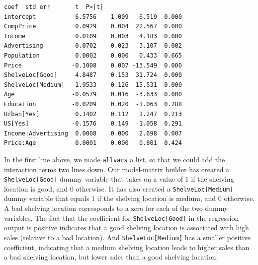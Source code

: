 \documentclass[11pt]{article}
\makeatletter
\newcommand{\boxspacing}{\kern\kvtcb@left@rule\kern\kvtcb@boxsep}
\newcommand{\prompt}[4]{
        {\ttfamily\llap{{\color{#2}[#3]:\hspace{3pt}#4}}\vspace{-\baselineskip}}
    }
\makeatother
\begin{document}
            \begin{tcolorbox}[breakable, size=fbox, boxrule=.5pt, pad at break*=1mm, opacityfill=0]
\prompt{Out}{outcolor}{36}{\boxspacing}
\begin{Verbatim}[commandchars=\\\{\}]
                      coef  std err       t  P>|t|
intercept           6.5756    1.009   6.519  0.000
CompPrice           0.0929    0.004  22.567  0.000
Income              0.0109    0.003   4.183  0.000
Advertising         0.0702    0.023   3.107  0.002
Population          0.0002    0.000   0.433  0.665
Price              -0.1008    0.007 -13.549  0.000
ShelveLoc[Good]     4.8487    0.153  31.724  0.000
ShelveLoc[Medium]   1.9533    0.126  15.531  0.000
Age                -0.0579    0.016  -3.633  0.000
Education          -0.0209    0.020  -1.063  0.288
Urban[Yes]          0.1402    0.112   1.247  0.213
US[Yes]            -0.1576    0.149  -1.058  0.291
Income:Advertising  0.0008    0.000   2.698  0.007
Price:Age           0.0001    0.000   0.801  0.424
\end{Verbatim}
\end{tcolorbox}
        
    In the first line above, we made \texttt{allvars} a list, so that we
could add the interaction terms two lines down. Our model-matrix builder
has created a \texttt{ShelveLoc{[}Good{]}} dummy variable that takes on
a value of 1 if the shelving location is good, and 0 otherwise. It has
also created a \texttt{ShelveLoc{[}Medium{]}} dummy variable that equals
1 if the shelving location is medium, and 0 otherwise. A bad shelving
location corresponds to a zero for each of the two dummy variables. The
fact that the coefficient for \texttt{ShelveLoc{[}Good{]}} in the
regression output is positive indicates that a good shelving location is
associated with high sales (relative to a bad location). And
\texttt{ShelveLoc{[}Medium{]}} has a smaller positive coefficient,
indicating that a medium shelving location leads to higher sales than a
bad shelving location, but lower sales than a good shelving location.


    
    
    
\end{document}
